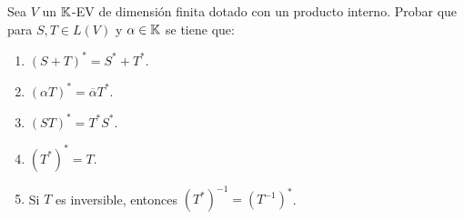 \item Sea $V$ un $\mathbb{K}$-EV de dimensión finita dotado con un producto interno. Probar que para $S,T\in L(V)$ y $\alpha\in\mathbb{K}$ se tiene que:
    \begin{enumerate}
        \item $(S+T)^*=S^*+T^*$.
            \begin{mdframed}[style=s]
                
            \end{mdframed}
        \item $(\alpha T)^*=\overline{\alpha}T^*$.
            \begin{mdframed}[style=s]
                
            \end{mdframed}
        \item $(ST)^*=T^*S^*$.
            \begin{mdframed}[style=s]
                
            \end{mdframed}
        \item $(T^*)^*=T$.
            \begin{mdframed}[style=s]
                
            \end{mdframed}
        \item Si $T$ es inversible, entonces $(T^*)^{-1}=(T^{-1})^*$.
            \begin{mdframed}[style=s]
                
            \end{mdframed}
    \end{enumerate}